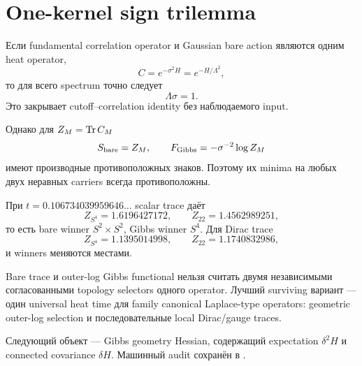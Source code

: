 \chapter{One-kernel sign trilemma}

Если fundamental correlation operator и Gaussian bare action являются одним
heat operator,
\begin{equation}
 C=e^{-\sigma^2H}=e^{-H/\Lambda^2},
\end{equation}
то для всего spectrum точно следует
\begin{equation}
 \boxed{\Lambda\sigma=1.}
\end{equation}
Это закрывает cutoff--correlation identity без наблюдаемого input.

Однако для \(Z_M=\operatorname{Tr} C_M\)
\begin{equation}
 S_{\rm bare}=Z_M,
 \qquad
 F_{\rm Gibbs}=-\sigma^{-2}\log Z_M
\end{equation}
имеют производные противоположных знаков. Поэтому их minima на любых двух
неравных carriers всегда противоположны.

При \(t=0.106734039959646\ldots\) scalar trace даёт
\begin{equation}
 Z_{S^4}=1.6196427172,
 \qquad Z_{22}=1.4562989251,
\end{equation}
то есть bare winner \(S^2\times S^2\), Gibbs winner \(S^4\). Для Dirac
trace
\begin{equation}
 Z_{S^4}=1.1395014998,
 \qquad Z_{22}=1.1740832986,
\end{equation}
и winners меняются местами.

\begin{theorem}
Bare trace и outer-log Gibbs functional нельзя считать двумя независимыми
согласованными topology selectors одного operator. Лучший surviving вариант
--- один universal heat time для family canonical Laplace-type operators:
geometric outer-log selection и последовательные local Dirac/gauge traces.
\end{theorem}

Следующий объект --- Gibbs geometry Hessian, содержащий expectation
\(\delta^2H\) и connected covariance \(\delta H\). Машинный audit сохранён
в .